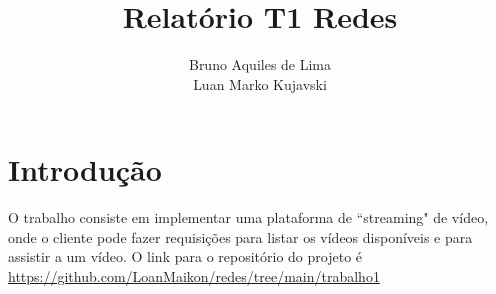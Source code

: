 \documentclass[a4paper, 12pt]{article}
\title{\textbf{Relatório T1 Redes}}
\author{Bruno Aquiles de Lima \\ Luan Marko Kujavski}
\date{}
\begin{document}
\maketitle

\section{Introdução}
O trabalho consiste em implementar uma plataforma de ``streaming" de vídeo, onde o 
cliente pode fazer requisições para listar os vídeos disponíveis e para assistir a
um vídeo. O link para o repositório do projeto é \url{https://github.com/LoanMaikon/redes/tree/main/trabalho1}
\end{document}
